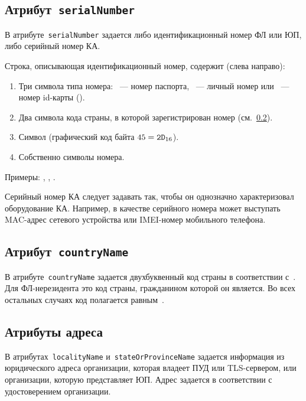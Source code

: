 \subsection{Атрибут~\texttt{serialNumber}}\label{ENTITIES.Id.SN}

В атрибуте~\texttt{serialNumber} задается либо идентификационный номер ФЛ 
или ЮП, либо серийный номер КА. 

Строка, описывающая идентификационный номер, содержит (слева направо):
\begin{enumerate}
\item
Три символа типа номера:
~--- номер паспорта, 
~--- личный номер или
~--- номер id-карты ().

\item
Два символа кода страны, в которой зарегистрирован номер 
(см.~\ref{ENTITIES.Id.C}).
\item
Символ \str{-} (графический код байта $45=\texttt{2D}_{16}$).
\item
Собственно символы номера.
\end{enumerate}

Примеры: , 
, 
.

Серийный номер КА следует задавать так, чтобы он однозначно 
характеризовал оборудование КА. Например, в качестве серийного номера 
может выступать MAC-адрес сетевого устройства или IMEI-номер мобильного 
телефона. 

\subsection{Атрибут~\texttt{countryName}}\label{ENTITIES.Id.C}

В атрибуте~\texttt{countryName} задается двухбуквенный код страны
в соответствии с~\cite{CountryCodes}. 
%
Для ФЛ-нерезидента это код страны, гражданином которой он является.
Во всех остальных случаях код полагается равным~.

\subsection{Атрибуты адреса}\label{ENTITIES.Id.L}

В атрибутах~\texttt{localityName} и~\texttt{stateOrProvinceName} 
задается информация из юридического адреса организации,
которая владеет ПУД или TLS-сервером, или организации, 
которую представляет ЮП.
%
Адрес задается в соответствии с удостоверением организации. 

